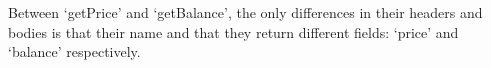 Between `getPrice' and `getBalance', the only differences in their
headers and bodies is that their name and that they return different
fields: `price' and `balance' respectively.
